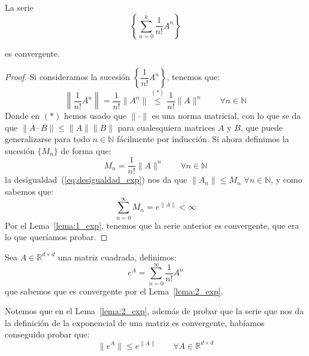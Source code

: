 \begin{lema}\label{lema:2_exp}
    La serie 
    \begin{equation*}
        \left\{\sum_{n=0}^{k}\dfrac{1}{n!}A^n\right\}
    \end{equation*}

    es convergente.
    \begin{proof}
        Si consideramos la sucesión $\left\{\dfrac{1}{n!}A^n\right\}$, tenemos que:
        \begin{equation}\label{eq:desigualdad_exp}
            \left\|\dfrac{1}{n!}A^n\right\| = \dfrac{1}{n!} \|A^n\| \stackrel{(\ast)}{\leq }\dfrac{1}{n!}\|A\|^n \qquad \forall n\in \mathbb{N}
        \end{equation}
        Donde en $(\ast)$ hemos usado que $\|\cdot \|$ es una norma matricial, con lo que se da que $\|A\cdot B\| \leq \|A\|\|B\|$ para cualesquiera matrices $A$ y $B$, que puede generalizarse para todo $n\in \mathbb{N}$ fácilmente por inducción. Si ahora definimos la sucesión $\{M_n\}$ de forma que:
        \begin{equation*}
            M_n = \dfrac{1}{n!}\|A\|^n \qquad \forall n\in \mathbb{N}
        \end{equation*}
        la desigualdad~(\ref{eq:desigualdad_exp}) nos da que $\|A_n\|\leq M_n$ $\forall n\in \mathbb{N}$, y como sabemos que:
        \begin{equation*}
            \sum_{n=0}^{\infty} M_n = e^{\|A\|} < \infty
        \end{equation*}
        Por el Lema~\ref{lema:1_exp}, tenemos que la serie anterior es convergente, que era lo que queríamos probar.
    \end{proof}
\end{lema}

\begin{definicion}
    Sea $A\in \mathbb{R}^{d\times d}$ una matriz cuadrada, definimos:
    \begin{equation*}
        e^A = \sum_{n=0}^{\infty} \dfrac{1}{n!} A^n
    \end{equation*}
    que sabemos que es convergente por el Lema~\ref{lema:2_exp}.
\end{definicion}

\begin{observacion}
    Notemos que en el Lema~\ref{lema:2_exp}, además de probar que la serie que nos da la definición de la exponencial de una matriz es convergente, habíamos conseguido probar que:
    \begin{equation*}
        \|e^A\| \leq e^{\|A\|} \qquad \forall A\in \mathbb{R}^{d\times d}
    \end{equation*}
\end{observacion}~\\


